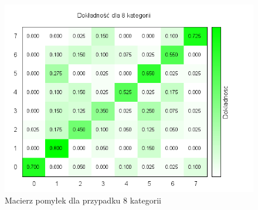 \begin{figure}[h]
	\centering
	\includegraphics[scale=0.8]{graphics/04_interpretacja_wynikow/confusion-matrix-8.png}
	\caption{ Macierz pomyłek dla przypadku 8 kategorii }
	\label{fig:confusion-matrix-8}
\end{figure}